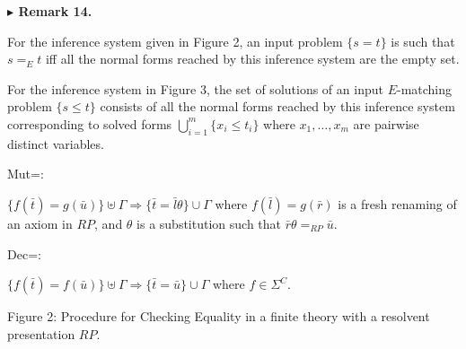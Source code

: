  
 
\par\medskip\noindent\textbf{$\blacktriangleright$ Remark 14.}\par
 
 
For the inference system given in Figure 2, an input problem $\{s=t\}$ is such that $s=_{E}t$ iff all the normal forms reached by this inference system are the empty set.\par
 
 
 
For the inference system in Figure 3, the set of solutions of an input $E$-matching problem $\{s\leq t\}$ consists of all the normal forms reached by this inference system corresponding to solved forms $\bigcup_{i=1}^{m}\{x_{i}\leq t_{i}\}$ where $x_{1},\dots,x_{m}$ are pairwise distinct variables.\par
 
 
 
    
\par
 
Mut=:\par
 
\par
 
$\{f(\bar{t})=g(\bar{u})\}\uplus\Gamma\Longrightarrow\{\bar{t}=\bar{l}\theta\}\cup\Gamma$ where $f(\bar{l})=g(\bar{r})$ is a fresh renaming of an axiom in $RP$, and $\theta$ is a substitution such that $\bar{r}\theta=_{RP}\bar{u}$.\par
     
\par
 
Dec=:\par
 
\par
 
$\{f(\bar{t})=f(\bar{u})\}\uplus\Gamma\Longrightarrow\{\bar{t}=\bar{u}\}\cup\Gamma$ where $f\in{\Sigma}^{C}$.\par
    
Figure 2: Procedure for Checking Equality in a finite theory with a resolvent presentation $RP$.\par
 
 
